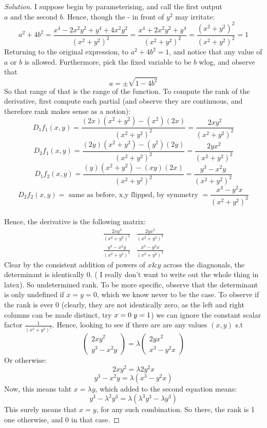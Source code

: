 \documentclass{article}
\newenvironment{problem}[2][Problem]{\begin{trivlist}
\item[\hskip \labelsep {\bfseries #1}\hskip \labelsep {\bfseries #2.}]}{\end{trivlist}}
\newenvironment{solution}{\begin{proof}[Solution]}{\end{proof}}
\begin{document}
\begin{problem}{9.24}
\end{problem}
\begin{solution}
	I suppose begin by parameterising, and call the first output $a \text{ and the second }b$. Hence, though the - in front of $y^{2}$ may irritate: \[
		a^{2}+4b^{2} = \frac{x^{4}-2x^{2}y^{2}+y^{4} + 4x^{2}y^{2}}{(x^{2}+y^{2})^{2}} = \frac{x^{4}+2x^{2}y^{2}+y^{4}}{(x^{2}+y^{2})^{2}} = \frac{(x^{2}+y^{2})^{2}}{(x^{2}+y^{2})^{2}} = 1
	\]
	Returning to the original expression, to $a^{2}+4b^{2}=1$, and notice that any value of $a \text{ or } b$ is allowed. Furthermore, pick the fixed variable to be $b$ wlog, and observe that \[
		a = \pm \sqrt{1-4b^{2}} 
	\]
So that range of that is the range of the function.
To compute the rank of the derivative, first compute each partial (and observe they are continuous, and therefore rank makes sense as a notion):
\[
	D_{1}f_{1}(x,y) = \frac{(2x)(x^{2}+y^{2}) - (x^{2})(2x)}{(x^{2}+y^{2})^{2}} = \frac{2xy^{2}}{(x^{2}+y^{2})^{2}}
\]
\[
	D_{2}f_{1}(x,y) = \frac{(2y)(x^{2}+y^{2}) - (y^{2})(2y)}{(x^{2}+y^{2})^{2}} = \frac{2yx^{2}}{(x^{2}+y^{2})^{2}}
\]
\[
	D_{1}f_{2}(x,y) = \frac{(y)(x^{2}+y^{2}) - (xy)(2x)}{(x^{2}+y^{2})^{2}} = \frac{y^{3}-x^{2}y}{(x^{2}+y^{2})^{2}}
\]
\[
		D_{2}f_{2}(x,y) = \text{ same as before, x,y flipped, by symmetry } = \frac{x^{3}-y^{2}x}{(x^{2}+y^{2})^{2}}
\]
\\
Hence, the derivative is the following matrix:
\[
	\begin{matrix}
		\frac{2xy^{2}}{(x^{2}+y^{2})^{2}} &  \frac{2yx^{2}}{(x^{2}+y^{2})^{2}} \\
		\frac{y^{3}-x^{2}y}{(x^{2}+y^{2})^{2}} & \frac{x^{3} - y^{2}x}{(x^{2}+y^{2})^{2}}
	\end{matrix}
\]
Clear by the consistent addition of powers of $x \text{\&} y$ across the diagnonals, the determinant is identically 0. ( I really don't want to write out the whole thing in latex).
So undetermined rank. To be more specific, observe that the determinant is only undefined if $x=y=0$, which we know never to be the case. To observe if the rank is ever 0 (clearly, they are not identically zero, as the left and right columns can be made distinct, try $x=0 \hspace{1mm} y =1$) we can ignore the constant scalar factor $\frac{1}{(x^{2}+y^{2})^2}$. Hence, looking to see if there are are any values $(x,y)$ s.t \[
	\begin{pmatrix}
		2xy^2 \\
		y^{3}-x^{2}y
	\end{pmatrix} = 
	\lambda \begin{pmatrix}
		2yx^2 \\
		x^{3}-y^{2}x
	\end{pmatrix}
\]
\[
\]
Or otherwise:
\[
2xy^{2} = \lambda 2y^{2}x
\]
\[
y^{3}-x^{2}y= \lambda (x^{3}-y^{2}x)\]
Now, this means taht $x = \lambda y $, which added to the second equation means:
\[
	y^{3} - \lambda^{2}y^{3} = \lambda(\lambda^{3}y^{3}- \lambda y^{3})
\]
This surely means that $x=y$, for any such combination. So there, the rank is 1 one otherwise, and 0 in that case. 
\newpage
\end{solution}
\begin{problem}{9.27}
\end{problem}
\end{document}
